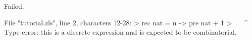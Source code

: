 \runverbatimfalse
{}
\begin{RunVerbatimMsg}
Failed.
\end{RunVerbatimMsg}
\begin{RunVerbatimErr}
File "tutorial.zls", line 2, characters 12-28:
>  rec nat = n -> pre nat + 1
>            ^^^^^^^^^^^^^^^^
Type error: this is a discrete expression and is expected to be combinatorial.
\end{RunVerbatimErr}
